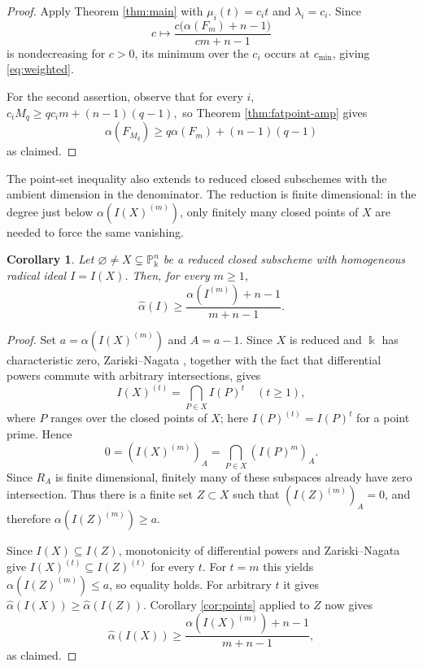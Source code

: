 \documentclass[11pt]{amsart}
\newtheorem{corollary}[theorem]{Corollary}
\theoremstyle{remark}
\newcommand{\PP}{\mathbb P}
\newcommand{\kk}{\Bbbk}
\begin{document}
\begin{proof}
Apply Theorem \ref{thm:main} with $\mu_i(t)=c_it$ and $\lambda_i=c_i$. Since
$$
c\longmapsto
\frac{c\bigl(\alpha(F_m)+n-1\bigr)}{cm+n-1}
$$
is nondecreasing for $c>0$, its minimum over the $c_i$ occurs at $c_{\min}$, giving \eqref{eq:weighted}.

For the second assertion, observe that for every $i$,
$
c_iM_q
\ge qc_im+(n-1)(q-1),
$
so Theorem \ref{thm:fatpoint-amp} gives
$$
\alpha(F_{M_q})
\ge q\alpha(F_m)+(n-1)(q-1)
$$
as claimed.
\end{proof}

The point-set inequality also extends to reduced closed subschemes with the ambient dimension in the denominator. The reduction is finite dimensional: in the degree just below $\alpha(I(X)^{(m)})$, only finitely many closed points of $X$ are needed to force the same vanishing.

\begin{corollary}\label{cor:subschemes}
Let $\varnothing\ne X\subsetneq\PP_\kk^n$ be a reduced closed subscheme with homogeneous radical ideal $I=I(X)$. Then, for every $m\ge1$,
$$
\widehat\alpha(I)
\ge
\frac{\alpha(I^{(m)})+n-1}{m+n-1}.
$$
\end{corollary}

\begin{proof}
Set $a=\alpha(I(X)^{(m)})$ and $A=a-1$. Since $X$ is reduced and $\kk$ has characteristic zero, Zariski--Nagata \cite{Zariski,Nagata}, together with the fact that differential powers commute with arbitrary intersections, gives
\begin{equation}\label{eq:subscheme-point-intersection}
I(X)^{(t)}=\bigcap_{P\in X}I(P)^t\quad(t\ge1),
\end{equation}
where $P$ ranges over the closed points of $X$; here $I(P)^{(t)}=I(P)^t$ for a point prime. Hence
$$
0=(I(X)^{(m)})_A=\bigcap_{P\in X}(I(P)^m)_A.
$$
Since $R_A$ is finite dimensional, finitely many of these subspaces already have zero intersection. Thus there is a finite set $Z\subset X$ such that $(I(Z)^{(m)})_A=0$, and therefore $\alpha(I(Z)^{(m)})\ge a$.

Since $I(X)\subseteq I(Z)$, monotonicity of differential powers and Zariski--Nagata give $I(X)^{(t)}\subseteq I(Z)^{(t)}$ for every $t$. For $t=m$ this yields $\alpha(I(Z)^{(m)})\le a$, so equality holds. For arbitrary $t$ it gives $\widehat\alpha(I(X))\ge\widehat\alpha(I(Z))$. Corollary \ref{cor:points} applied to $Z$ now gives
$$
\widehat\alpha(I(X))
\ge
\frac{\alpha(I(X)^{(m)})+n-1}{m+n-1},
$$
as claimed.
\end{proof}
\end{document}
